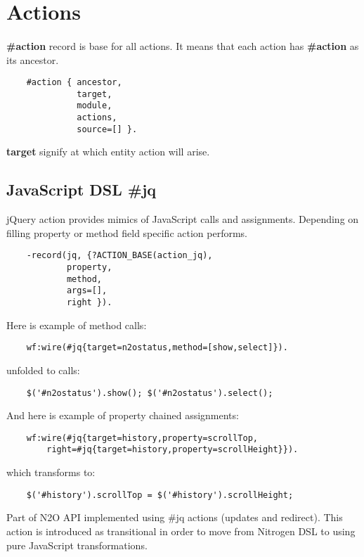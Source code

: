 \section{Actions}

\paragraph{}
{\bf \#action} record is base for all actions. It means that each action
has {\bf \#action} as its ancestor.

\vspace{1\baselineskip}
\begin{lstlisting}
    #action { ancestor,
              target,
              module,
              actions,
              source=[] }.
\end{lstlisting}
\vspace{1\baselineskip}

{\bf target} signify at which entity action will arise.

\subsection{JavaScript DSL {\bf \#jq}}
jQuery action provides mimics of JavaScript calls and assignments.
Depending on filling property or method field specific action performs.

\vspace{1\baselineskip}
\begin{lstlisting}
    -record(jq, {?ACTION_BASE(action_jq),
            property,
            method,
            args=[],
            right }).
\end{lstlisting}
\vspace{1\baselineskip}

Here is example of method calls:
\begin{lstlisting}
    wf:wire(#jq{target=n2ostatus,method=[show,select]}).
\end{lstlisting}
unfolded to calls:
\begin{lstlisting}
    $('#n2ostatus').show(); $('#n2ostatus').select();
\end{lstlisting}
\vspace{1\baselineskip}

And here is example of property chained assignments:
\begin{lstlisting}
    wf:wire(#jq{target=history,property=scrollTop,
        right=#jq{target=history,property=scrollHeight}}).
\end{lstlisting}
which transforms to:
\begin{lstlisting}
    $('#history').scrollTop = $('#history').scrollHeight;
\end{lstlisting}
\vspace{1\baselineskip}
Part of N2O API implemented using \#jq actions (updates and redirect).
This action is introduced as transitional in order to move
from Nitrogen DSL to using pure JavaScript transformations.

